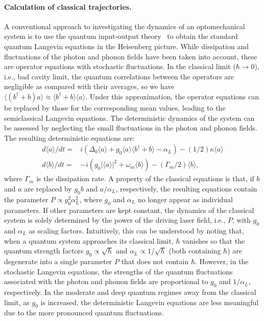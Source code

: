 \documentclass[12pt]{wlscirep}
\begin{document}
\paragraph*{Calculation of classical trajectories.}
A conventional approach to investigating the dynamics of an optomechanical 
system is to use the quantum input-output theory~\cite{GZ:book} to
obtain the standard quantum Langevin equations in the Heisenberg picture.
While dissipation and fluctuations of the photon and phonon fields
have been taken into account, these are operator equations with stochastic 
fluctuations. In the classical limit ($\hbar\rightarrow 0$), i.e., bad cavity
limit, the quantum correlations between the operators 
are negligible as compared with their averages, so we have~\cite{ME:2009} 
$\langle(b^\dagger+b)a\rangle\approx\langle b^\dagger+b\rangle\langle a\rangle$.
Under this approximation, the operator equations can be replaced by those 
for the corresponding mean values, leading to the semiclassical Langevin 
equations. The deterministic dynamics of the system can be assessed by 
neglecting the small fluctuations in the photon and phonon fields. The 
resulting deterministic equations are:
\begin{equation} \label{eq:classical}
\begin{aligned}
d\langle a\rangle/dt =& i(\Delta_0\langle a\rangle
+g_0\langle a\rangle\langle b^\dagger+b\rangle
-\alpha_L)- (1/2)\kappa\langle a\rangle \\
d\langle b\rangle/dt =& - i(g_0|\langle a\rangle|^2
+\omega_m\langle b\rangle)-(\Gamma_m/2)\langle b\rangle,
\end{aligned}
\end{equation}
where $\Gamma_m$ is the dissipation rate.
A property of the classical equations is that, if 
$b$ and $a$ are replaced by $g_0b$ and $a/\alpha_L$, respectively, 
the resulting equations contain the parameter $P\propto g_0^2\alpha_L^2$,
where $g_0$ and $\alpha_L$ no longer appear as individual parameters. 
If other parameters are kept constant, the dynamics of the classical system
is solely determined by the power of the driving laser field, i.e., $P$, 
with $g_0$ and $\alpha_L$ as scaling factors. Intuitively, this can be 
understood by noting that, when a quantum system approaches its classical
limit, $\hbar$ vanishes so that the quantum strength factors
$g_0\propto\sqrt{\hbar}$ and $\alpha_L\propto1/\sqrt{\hbar}$ (both containing
$\hbar$) are degenerate into a single parameter $P$ that does not contain
$\hbar$. However, in the stochastic Langevin equations, the strengths of the
quantum fluctuations associated with the photon and phonon fields are
proportional to $g_0$ and $1/\alpha_L$, respectively. In the moderate and deep
quantum regimes away from the classical limit, as $g_0$ is increased, the
deterministic Langevin equations are less meaningful due to the more
pronounced quantum fluctuations. 
\end{document}
